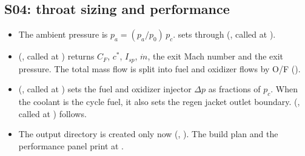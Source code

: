 \subsection{S04: throat sizing and performance}\label{sec:df-s04}
\begin{itemize}
  \item The ambient pressure is $p_a = (p_a/p_0)\,p_c$.  sets  through  (, called at ).
  \item {} (, called at ) returns $C_F$, $c^*$, $I_{sp}$, $\dot m$, the exit Mach number and the exit pressure. The total mass flow is split into fuel and oxidizer flows by O/F ().
  \item {} (, called at ) sets the fuel and oxidizer injector $\Delta p$ as fractions of $p_c$. When the coolant is the cycle fuel, it also sets the regen jacket outlet boundary.  (, called at ) follows.
  \item The output directory is created only now (, ). The build plan and the performance panel print at .
\end{itemize}


